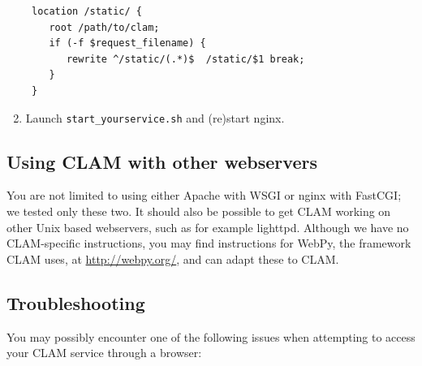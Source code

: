 \documentclass[a4paper,12pt]{report}
\begin{document}
\begin{enumerate}
\begin{verbatim}
 location /static/ {
    root /path/to/clam;
    if (-f $request_filename) {
       rewrite ^/static/(.*)$  /static/$1 break;
    }
 }
\end{verbatim}
\item Launch \texttt{start\_yourservice.sh}  and (re)start nginx.
\end{enumerate}


\subsection{Using CLAM with other webservers}

You are not limited to using either Apache with WSGI or nginx with FastCGI; we
tested only these two. It should also be possible to get CLAM working on other
Unix based webservers, such as for example lighttpd. Although we have no
CLAM-specific instructions, you may find instructions for WebPy, the framework
CLAM uses, at \url{http://webpy.org/}, and can adapt these to CLAM.








\subsection{Troubleshooting}

You may possibly encounter one of the following issues when attempting to access your CLAM service through a browser:
\end{document}
